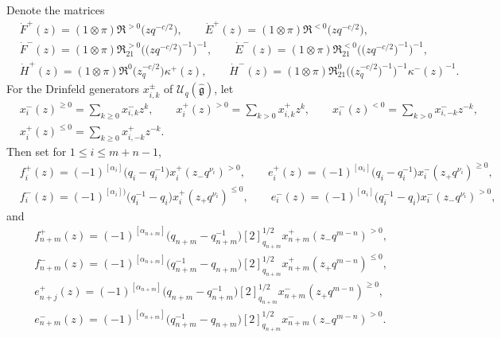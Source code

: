 \documentclass[pdftex]{sigma}
\numberwithin{equation}{section}
\begin{document}
Denote the matrices
\begin{align*}
 &\dot{F}^+(z)=(1\otimes\pi)\mathfrak{R}^{>0}\bigl(zq^{-c/2}\bigr),\qquad \dot{E}^+(z)=(1\otimes\pi)\mathfrak{R}^{<0}\bigl(zq^{-c/2}\bigr), \\
 &\dot{F}^-(z)=(1\otimes\pi)\mathfrak{R}^{>0}_{21}\bigl(\bigl(zq^{-c/2}\bigr)^{-1}\bigr)^{-1},\qquad \dot{E}^-(z)=(1\otimes\pi)\mathfrak{R}^{<0}_{21}\bigl(\bigl(zq^{-c/2}\bigr)^{-1}\bigr)^{-1}, \\
 & \dot{H}^+(z)=(1\otimes\pi)\mathfrak{R}^{0}\bigl(z_q^{-c/2}\bigr)\kappa^{+}(z),\qquad
 \dot{H}^-(z)=(1\otimes\pi)\mathfrak{R}_{21}^{0}\bigl(\bigl(z_q^{-c/2}\bigr)^{-1}\bigr)^{-1}\kappa^{-}(z)^{-1}.
\end{align*}
For the Drinfeld generators $x_{i,k}^{\pm}$ of $\mathcal{U}_q(\mathfrak{\hat{g}})$, let
\begin{align*}
 & x_i^-(z)^{\geq0} =\sum\limits_{k\geq0}x_{i,k}^{-}z^k,\qquad x_i^+(z)^{>0} =\sum\limits_{k>0}x_{i,k}^{+}z^k,\qquad x_i^-(z)^{<0} =\sum\limits_{k>0}x_{i,-k}^{-}z^{-k},\\
 & x_i^+(z)^{\leq0} =\sum\limits_{k\geq0}x_{i,-k}^{+}z^{-k}.
\end{align*}
Then set for $1\leq i\leq m+n-1$,
\begin{align*}
 & f_i^+(z)=(-1)^{[\alpha_{i}]}\bigl(q_i-q_i^{-1}\bigr)x_i^+(z_-q^{\nu_i})^{>0},\qquad e_i^+(z)=(-1)^{[\alpha_{i}]}\bigl(q_i-q_i^{-1}\bigr) x_i^-(z_+q^{\nu_i})^{\geq0},\\
 & f_i^-(z)=(-1)^{[\alpha_{i}])}\bigl(q_i^{-1}-q_i\bigr)x_i^+(z_+q^{\nu_i})^{\leq0},\qquad e_i^-(z)=(-1)^{[\alpha_{i}]}\bigl(q_i^{-1}-q_i\bigr) x_i^-(z_-q^{\nu_i})^{>0},
\end{align*}
and
\begin{align*}
 & f_{n+m}^+(z)=(-1)^{[\alpha_{n+m}]}\bigl(q_{n+m}-q_{n+m}^{-1}\bigr)[2]^{1/2}_{q_{n+m}}x_{n+m}^+(z_-q^{m-n})^{>0},\\ & f_{n+m}^-(z)=(-1)^{[\alpha_{n+m}]}\bigl(q_{n+m}^{-1}-q_{n+m}\bigr)[2]^{1/2}_{q_{n+m}}x_{n+m}^+(z_+q^{m-n})^{\leq0},\\
 &e_{n+j}^+(z)=(-1)^{[\alpha_{n+m}]}\bigl(q_{n+m}-q_{n+m}^{-1}\bigr)[2]^{1/2}_{q_{n+m}} x_{n+m}^-(z_+q^{m-n})^{\geq0},\\
 &e_{n+m}^-(z)=(-1)^{[\alpha_{n+m}]}\bigl(q_{n+m}^{-1}-q_{n+m}\bigr)[2]^{1/2}_{q_{n+m}} x_{n+m}^-(z_-q^{m-n})^{>0}.
\end{align*}
\end{document}
